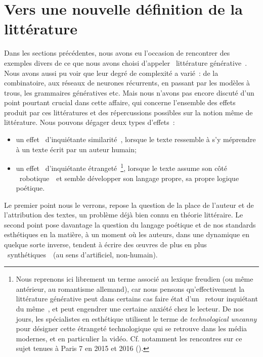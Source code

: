 \documentclass{article}
\begin{document}
	\section{Vers une nouvelle définition de la littérature}\label{nouvelle_definition}
		Dans les sections précédentes, nous avons eu l'occasion de rencontrer des exemples divers de ce que nous avons choisi d'appeler  \guillemotleft~littérature générative~\guillemotright. Nous avons aussi pu voir que leur degré de complexité a varié~: de la combinatoire, aux réseaux de neurones récurrents, en passant par les modèles à trous, les grammaires génératives etc.
		Mais nous n'avons pas encore discuté d'un point pourtant crucial dans cette affaire, qui concerne l'ensemble des effets produit par ces littératures et des répercussions possibles sur la notion même de littérature. Nous pouvons dégager deux types d'effets~:
		\vspace{2mm}
		\begin{itemize}
			\item un effet \guillemotleft~d'inquiétante similarité~\guillemotright, lorsque le texte ressemble à s'y méprendre à un texte écrit par un auteur humain;
			\item un effet \guillemotleft~d'inquiétante étrangeté~\guillemotright\footnote{Nous reprenons ici librement un terme associé au lexique freudien (ou même antérieur, au romantisme allemand), car nous pensons qu'effectivement la littérature générative peut dans certains cas faire état d'un \guillemotleft~retour inquiétant du même~\guillemotright, et peut engendrer une certaine anxiété chez le lecteur. De nos jours, les spécialistes en esthétique utilisent le terme de \textit{technological uncanny} pour désigner cette étrangeté technologique qui se retrouve dans les média modernes, et en particulier la vidéo. Cf. notamment les rencontres sur ce sujet tenues à Paris 7 en 2015 et 2016 (\cite{uncanny}).}, lorsque le texte assume son côté \guillemotleft~robotique~\guillemotright~et semble développer son langage propre, sa propre logique poétique.
		\end{itemize}
		\vspace{2mm}
		Le premier point nous le verrons, repose la question de la place de l'auteur et de l'attribution des textes, un problème déjà bien connu en théorie littéraire. Le second point pose davantage la question du langage poétique et de nos standards esthétiques en la matière, à un moment où les auteurs, dans une dynamique en quelque sorte inverse, tendent à écrire des œuvres de plus en plus \guillemotleft~synthétiques~\guillemotright~(au sens d'artificiel, non-humain).\\
\end{document}
